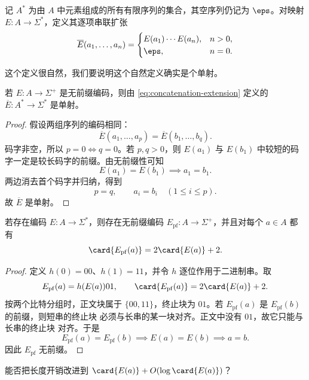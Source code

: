 记 $A^*$ 为由 $A$ 中元素组成的所有有限序列的集合，其空序列仍记为
$\eps$。对映射 $E:A\to\Sigma^*$，定义其逐项串联扩张
\begin{equation}
  \label{eq:concatenation-extension}
  \overline E(a_1,\ldots,a_n)=
  \begin{cases}
    E(a_1)\cdots E(a_n), & n>0,\\
    \eps, & n=0.
  \end{cases}
\end{equation}

这个定义很自然，我们要说明这个自然定义确实是个单射。

\begin{lemma}
  \label{lem:prefix-extension-injective}
  若 $E:A\to\Sigma^+$ 是无前缀编码，则由
  \cref{eq:concatenation-extension} 定义的
  $\overline E:A^*\to\Sigma^*$ 是单射。
\end{lemma}

\begin{proof}
  假设两组序列的编码相同：
  \[
    \overline E(a_1,\ldots,a_p)
    =\overline E(b_1,\ldots,b_q).
  \]
  码字非空，所以 $p=0\iff q=0$。若 $p,q>0$，则
  $E(a_1)$ 与 $E(b_1)$ 中较短的码字一定是较长码字的前缀。由无前缀性可知
  \[
    E(a_1)=E(b_1)
    \implies a_1=b_1.
  \]
  两边消去首个码字并归纳，得到
  \[
    p=q,\qquad a_i=b_i\quad(1\leq i\leq p).
  \]
  故 $\overline E$ 是单射。
\end{proof}

\begin{theorem}[编码的无前缀化]
  \label{thm:prefix-free-construction}
  若存在编码 $E:A\to\Sigma^*$，则存在无前缀编码
  $E_{\mathrm{pf}}:A\to\Sigma^+$，并且对每个 $a\in A$ 都有
  \[
    \card{E_{\mathrm{pf}}(a)}=2\card{E(a)}+2.
  \]
\end{theorem}

\begin{proof}
  定义 $h(0)=00$、$h(1)=11$，并令 $h$ 逐位作用于二进制串。取
  \[
    E_{\mathrm{pf}}(a)=h(E(a))01,
    \qquad
    \card{E_{\mathrm{pf}}(a)}=2\card{E(a)}+2.
  \]
  按两个比特分组时，正文块属于 $\{00,11\}$，终止块为 $01$。若
  $E_{\mathrm{pf}}(a)$ 是 $E_{\mathrm{pf}}(b)$ 的前缀，则短串的终止块
  必须与长串的某一块对齐。正文中没有 $01$，故它只能与长串的终止块
  对齐。于是
  \[
    E_{\mathrm{pf}}(a)=E_{\mathrm{pf}}(b)
    \implies E(a)=E(b)
    \implies a=b.
  \]
  因此 $E_{\mathrm{pf}}$ 无前缀。
\end{proof}

\begin{question}
  能否把长度开销改进到
  $\card{E(a)}+O(\log \card{E(a)})$？
\end{question}

